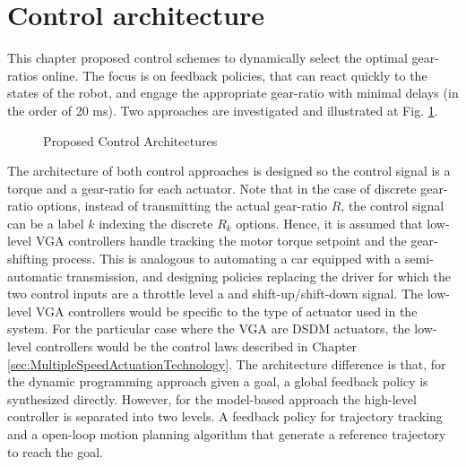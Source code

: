\newpage

\section{Control architecture}
\label{sec:arch}

This chapter proposed control schemes to dynamically select the optimal gear-ratios online. The focus is on feedback policies, that can react quickly to the states of the robot, and engage the appropriate gear-ratio with minimal delays (in the order of 20 ms). Two approaches are investigated and illustrated at Fig. \ref{fig:controlarchitectures}. 
%
\begin{figure}[H]
				\vspace{-10pt}
        \centering
				\hspace{+10pt}
        \caption{Proposed Control Architectures}
				\label{fig:controlarchitectures}
\end{figure}
%
The architecture of both control approaches is designed so the control signal is a torque and a gear-ratio for each actuator. Note that in the case of discrete gear-ratio options, instead of transmitting the actual gear-ratio $R$, the control signal can be a label $k$ indexing the discrete $R_k$ options. Hence, it is assumed that low-level VGA controllers handle tracking the motor torque setpoint and the gear-shifting process. This is analogous to automating a car equipped with a semi-automatic transmission, and designing policies replacing the driver for which the two control inputs are a throttle level a and shift-up/shift-down signal. The low-level VGA controllers would be specific to the type of actuator used in the system. For the particular case where the VGA are DSDM actuators, the low-level controllers would be the control laws described in Chapter \ref{sec:MultipleSpeedActuationTechnology}. The architecture difference is that, for the dynamic programming approach given a goal, a global feedback policy is synthesized directly. However, for the model-based approach the high-level controller is separated into two levels. A feedback policy for trajectory tracking and a open-loop motion planning algorithm that generate a reference trajectory to reach the goal. 

